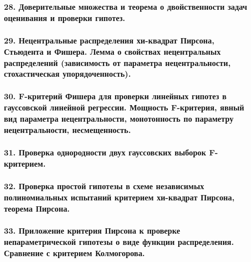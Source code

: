 \documentclass[12pt, russian]{article}
\begin{document}
\newpage
\subsubsection*{28. Доверительные множества и теорема о двойственности задач оценивания и проверки гипотез.}

\newpage
\subsubsection*{29. Нецентральные распределения хи-квадрат Пирсона, Стьюдента и Фишера. Лемма о свойствах нецентральных распределений (зависимость от параметра нецентральности, стохастическая упорядоченность).}

\newpage
\subsubsection*{30. F-критерий Фишера для проверки линейных гипотез в гауссовской линейной регрессии. Мощность F-критерия, явный вид параметра нецентральности, монотонность по параметру нецентральности, несмещенность.}

\newpage
\subsubsection*{31. Проверка однородности двух гауссовских выборок F-критерием.}

\newpage
\subsubsection*{32. Проверка простой гипотезы в схеме независимых полиномиальных испытаний критерием хи-квадрат Пирсона, теорема Пирсона.}

\newpage
\subsubsection*{33. Приложение критерия Пирсона к проверке непараметрической гипотезы о виде функции распределения. Сравнение с критерием Колмогорова.}
\end{document}
